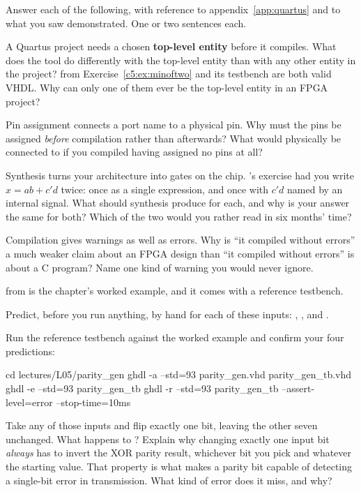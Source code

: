 \label{c5:ex:quartus}
Answer each of the following, with reference to appendix~\ref{app:quartus} and to what you saw
demonstrated. One or two sentences each.

 A Quartus project needs a chosen \textbf{top-level entity} before it compiles. What does
the tool do differently with the top-level entity than with any other entity in the project?
 from Exercise~\ref{c5:ex:minoftwo} and its testbench are both valid VHDL. Why can
only one of them ever be the top-level entity in an FPGA project?

 Pin assignment connects a port name to a physical pin. Why must the pins be assigned
\emph{before} compilation rather than afterwards? What would  physically be connected to if
you compiled  having assigned no pins at all?

 Synthesis turns your architecture into gates on the chip. 's exercise
 had you write $x = ab + c'd$ twice: once as a single expression, and once with
$c'd$ named by an internal signal. What should synthesis produce for each, and why is your answer
the same for both? Which of the two would you rather read in six months' time?

 Compilation gives warnings as well as errors. Why is ``it compiled without errors'' a much
weaker claim about an FPGA design than ``it compiled without errors'' is about a C program? Name one
kind of warning you would never ignore.

\label{c5:ex:parity}
 from  is the chapter's worked example, and it comes with a
reference testbench.

 Predict, before you run anything,  by hand for each of these inputs:
, ,  and .

 Run the reference testbench against the worked example and confirm your four predictions:

\begin{shell}
cd lectures/L05/parity_gen
ghdl -a --std=93 parity_gen.vhd parity_gen_tb.vhd
ghdl -e --std=93 parity_gen_tb
ghdl -r --std=93 parity_gen_tb --assert-level=error --stop-time=10ms
\end{shell}

 Take any of those inputs and flip exactly one bit, leaving the other seven unchanged. What
happens to ? Explain why changing exactly one input bit \emph{always} has to invert the
XOR parity result, whichever bit you pick and whatever the starting value. That property is what
makes a parity bit capable of detecting a single-bit error in transmission. What kind of error does
it miss, and why?

